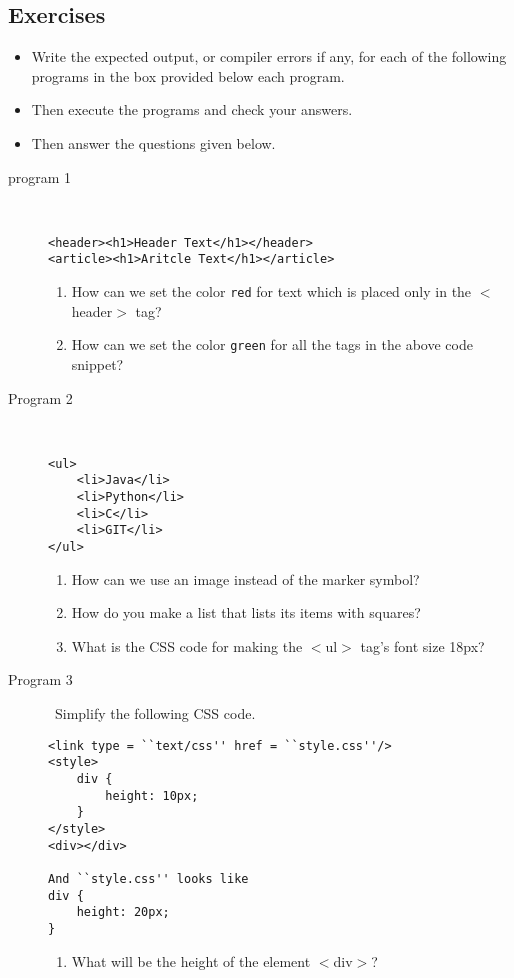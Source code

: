 \documentclass[11pt,a4paper]{article}
\def\AnswerBox{\fbox{\begin{minipage}{4in}\hfill\vspace{0.5in}\end{minipage}}}
\begin{document}
\subsection*{Exercises}
\begin{itemize}
\item Write the expected output, or compiler errors if any, for each of the following programs in the box provided below each program.
\item Then execute the programs and check your answers.
\item Then answer the questions given below.
\end{itemize}
\begin{description}
\item[program 1]\
\begin{lstlisting}
<header><h1>Header Text</h1></header>
<article><h1>Aritcle Text</h1></article>
\end{lstlisting}
\AnswerBox

\begin{enumerate}[label=\bfseries Q\arabic*:]\itemsep10pt
\item How can we set the color \texttt{red} for text which is placed only in the $<$header$>$ tag?
\item How can we set the color \texttt{green} for all the tags in the above code snippet?
\end{enumerate}
\item[Program 2]\
\begin{lstlisting}
<ul>
    <li>Java</li>
    <li>Python</li>
    <li>C</li>
    <li>GIT</li>
</ul>
\end{lstlisting}
\AnswerBox
\begin{enumerate}[label=\bfseries Q\arabic*:]\itemsep10pt
\item How can we use an image instead of the marker symbol?
\item How do you make a list that lists its items with squares?
\item What is the CSS code for making the $<$ul$>$ tag's font size 18px?
\end{enumerate}

\item [Program 3]\ Simplify the following CSS code.
\begin{lstlisting}
<link type = ``text/css'' href = ``style.css''/>
<style>
    div {
        height: 10px;
    }
</style>
<div></div>

And ``style.css'' looks like
div {
    height: 20px;
}
\end{lstlisting}
\AnswerBox
\begin{enumerate}[label=\bfseries Q\arabic*:]\itemsep10pt
\item What will be the height of the element $<$div$>$?
\end{enumerate}


\end{description}
\end{document}
